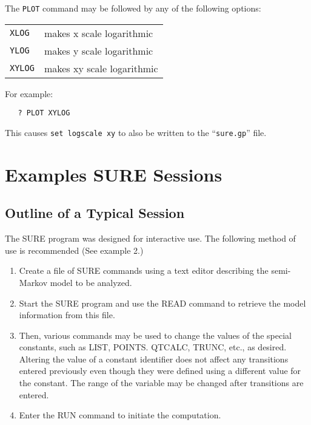 The \verb|PLOT| command may be followed by any of the following options:
\begin{flushleft}
\begin{tabular}{lp{5.0in}}
   \verb|XLOG| & makes x scale logarithmic \\
   \verb|YLOG| & makes y scale logarithmic \\
   \verb|XYLOG| & makes xy scale logarithmic \\
\end{tabular}
\end{flushleft}
For example:
\begin{verbatim}
   ? PLOT XYLOG
\end{verbatim}
This causes \verb|set logscale xy| to also be written to the ``\verb|sure.gp|'' file.


\section{Examples SURE Sessions}

\subsection{Outline of a Typical Session }



The SURE program was designed for interactive use.  The following method of
use is recommended (See example 2.)
\begin{enumerate}
   \item  Create a file of SURE commands using a text editor describing the
   semi-Markov model to be analyzed.

   \item  Start the SURE program and use the {\isf READ} command to retrieve the model
   information from this file.

   \item Then, various commands may be used to change the values of the
   special constants, such as {\isf LIST}, {\isf POINTS}. {\isf QTCALC}, {\isf
   TRUNC}, etc., as desired.  Altering the value of a constant identifier does
   not affect any transitions entered previously even though they were defined
   using a different value for the constant.  The range of the variable may be
   changed after transitions are entered.

   \item Enter the {\isf RUN} command to initiate the computation.
\end{enumerate}


